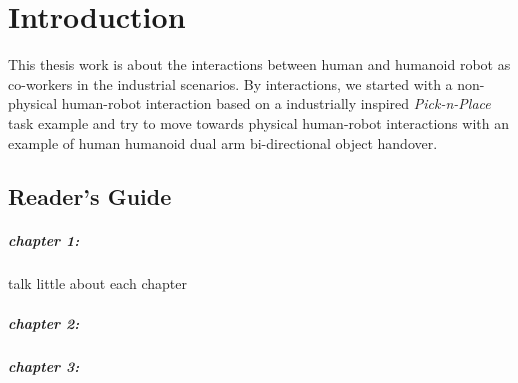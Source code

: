 \chapter{Introduction}

This thesis work is about the interactions between human and humanoid robot as co-workers in the industrial scenarios. By interactions, we started with a non-physical human-robot interaction based on a industrially inspired \textit{Pick-n-Place} task example and try to move towards physical human-robot interactions with an example of human humanoid dual arm bi-directional object handover.

\section{Reader's Guide}

\paragraph{chapter 1:}
talk little about each chapter

\paragraph{chapter 2:}

\paragraph{chapter 3:}


